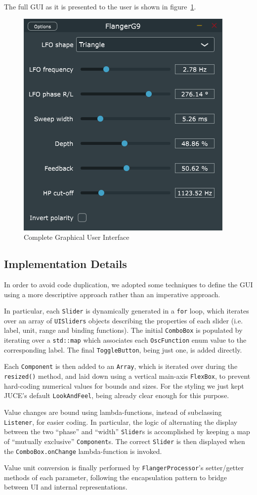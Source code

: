The full GUI as it is presented to the user is shown in figure~\ref{fig:gui-all}.

\begin{figure}
	\centering
	\includegraphics[width=0.5\linewidth]{assets/gui-all.png}
	\caption{Complete Graphical User Interface}
	\label{fig:gui-all}
\end{figure}

\subsection{Implementation Details}\label{sec:gui-implementation}

\nocite{juce}

In order to avoid code duplication, we adopted some techniques to define the GUI using a more descriptive approach rather than an imperative approach.

In particular, each \texttt{Slider} is dynamically generated in a \texttt{for} loop, which iterates over an array of \texttt{UISliders} objects describing the properties of each slider (i.e. label, unit, range and binding functions).
The initial \texttt{ComboBox} is populated by iterating over a \texttt{std::map} which associates each \texttt{OscFunction} enum value to the corresponding label. The final \texttt{ToggleButton}, being just one, is added directly.

Each \texttt{Component} is then added to an \texttt{Array}, which is iterated over during the \texttt{resized()} method, and laid down using a vertical main-axis \texttt{FlexBox}, to prevent hard-coding numerical values for bounds and sizes. For the styling we just kept JUCE's default \texttt{LookAndFeel}, being already clear enough for this purpose.

Value changes are bound using lambda-functions, instead of subclassing \texttt{Listener}, for easier coding.
In particular, the logic of alternating the display between the two ``phase'' and ``width'' \texttt{Slider}s is accomplished by keeping a map of ``mutually exclusive'' \texttt{Component}s. The correct \texttt{Slider} is then displayed when the \texttt{ComboBox.onChange} lambda-function is invoked.

Value unit conversion is finally performed by \texttt{FlangerProcessor}'s setter/getter methods of each parameter, following the encapsulation pattern to bridge between UI and internal representations.